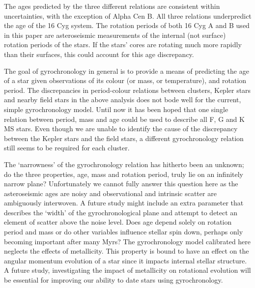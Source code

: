 \documentclass[useAMS, usenatbib]{mn2e}
\begin{document}
The ages predicted by the three different relations are consistent within
uncertainties, with the exception of Alpha Cen B.
All three relations underpredict the age of the 16 Cyg system.
The rotation periods of both 16 Cyg A and B used in this paper are
asteroseismic measurements of the internal (not surface) rotation periods
of the stars.
If the stars' cores are rotating much more rapidly than their surfaces, this
could account for this age discrepancy.

The goal of gyrochronology in general is to provide a means of predicting the
age of a star given observations of its colour (or mass, or temperature), and
rotation period.
The discrepancies in period-colour relations between clusters, Kepler stars
and nearby field stars in the above analysis does not bode well for the
current, simple gyrochronology model.
Until now it has been hoped that one single relation between period, mass and
age could be used to describe all F, G and K MS stars.
Even though we are unable to identify the cause of the discrepancy between the
Kepler stars and the field stars, a different gyrochronology relation still
seems to be required for each cluster.

The `narrowness' of the gyrochronology relation has hitherto been an unknown;
do the three properties, age, mass and rotation period, truly lie on an
infinitely narrow plane?
Unfortunately we cannot fully answer this question here as the asteroseismic
ages are noisy and observational and intrinsic scatter are ambiguously
interwoven.
A future study might include an extra parameter that describes the `width' of
the gyrochronological plane and attempt to detect an element of scatter above
the noise level.
Does age depend solely on rotation period and mass or do other variables
influence stellar spin down, perhaps only becoming important after many Myrs?
The gyrochronology model calibrated here neglects the effects of metallicity.
This property is bound to have an effect on the angular momentum evolution
of a star since it impacts internal stellar structure.
A future study, investigating the impact of metallicity on rotational evolution
will be essential for improving our ability to date stars using gyrochronology.
\end{document}
